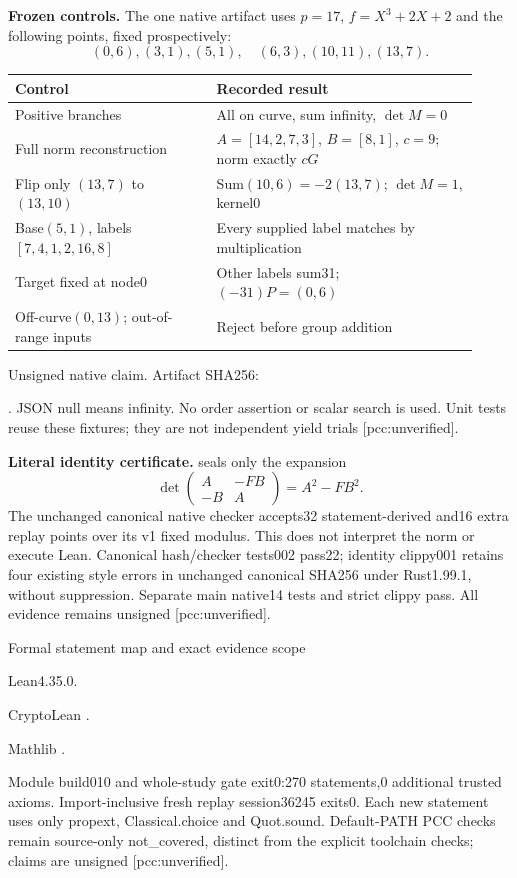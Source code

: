 \documentclass[11pt]{article}
\begin{document}
\textbf{Frozen controls.} The one native artifact uses $p=17$,
$f=X^3+2X+2$ and the following points, fixed prospectively:
\[(0,6),(3,1),(5,1),\quad(6,3),(10,11),(13,7).\]
\begin{center}\small
\begin{tabular}{p{0.40\linewidth}p{0.52\linewidth}}
Control & Recorded result\\\hline
Positive branches & All on curve, sum infinity, $\det M=0$\\
Full norm reconstruction & $A=[14,2,7,3]$, $B=[8,1]$, $c=9$; norm exactly $cG$\\
Flip only $(13,7)$ to $(13,10)$ & Sum$(10,6)=-2(13,7)$; $\det M=1$, kernel0\\
Base$(5,1)$, labels$[7,4,1,2,16,8]$ & Every supplied label matches by multiplication\\
Target fixed at node0 & Other labels sum31; $(-31)P=(0,6)$\\
Off-curve$(0,13)$; out-of-range inputs & Reject before group addition
\end{tabular}
\end{center}
Unsigned native claim. Artifact SHA256:\par
{}.
JSON null means infinity. No order assertion or scalar search is used.
Unit tests reuse these fixtures; they are not independent yield trials
[pcc:unverified].

\textbf{Literal identity certificate.}
 seals only the expansion
\[\det\left(\begin{smallmatrix}A&-FB\\-B&A\end{smallmatrix}\right)=A^2-FB^2.\]
The unchanged canonical native checker accepts32 statement-derived and16
extra replay points over its v1 fixed modulus. This does not interpret the
norm or execute Lean. Canonical hash/checker tests002 pass22; identity
clippy001 retains four existing style errors in unchanged canonical SHA256
under Rust1.99.1, without suppression. Separate main native14 tests and
strict clippy pass. All evidence remains unsigned [pcc:unverified].

\newpage
{\Large Formal statement map and exact evidence scope}\par
Lean4.35.0.\par
CryptoLean .\par
Mathlib .\par
Module build010 and whole-study gate exit0:270 statements,0 additional
trusted axioms. Import-inclusive fresh replay session36245 exits0.
Each new statement uses only propext, Classical.choice and Quot.sound.
Default-PATH PCC checks remain source-only not\_covered, distinct from the
explicit toolchain checks; claims are unsigned [pcc:unverified].
\end{document}
